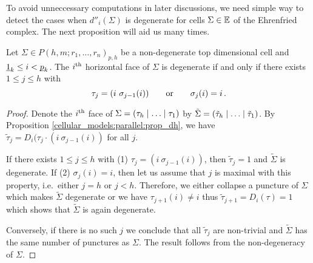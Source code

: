 To avoid unneccessary computations in later discussions, we need simple way to detect the cases when $d''_i(\Sigma)$ is degenerate for cells $\Sigma \in \E$ of the Ehrenfried complex.
The next proposition will aid us many times.

\begin{prop}
\label{cellular_models:ehrenfried:cor_d_hor_deg}
Let $\Sigma \in P(h,m;r_1, \ldots, r_n)_{p,h}$ be a non-degenerate top dimensional cell and $\ul 1_k \le i < \ul p_k$.
The $i\Th$ horizontal face of $\Sigma$ is degenerate if and only if there exists $1 \le j \le h$ with
\[
    \tau_j = (i\ \sigma_{j-1}(i)) \mspc{or}{20} \sigma_j(i) = i \,.
\]
\end{prop}
\begin{proof}
Denote the $i\Th$ face of $\Sigma = \inhom$ by $\tilde \Sigma = \inhom[\tilde\tau]$.
By Proposition \ref{cellular_models:parallel:prop_dh}, we have $\tilde\tau_j = D_i(\tau_j \cdot ( i\ \sigma_{j-1}(i))$ for all $j$.

If there exists $1 \le j \le h$ with (1) $\tau_j = (i\ \sigma_{j-1}(i))$, then $\tilde\tau_j = 1$ and $\tilde\Sigma$ is degenerate.
If (2) $\sigma_j(i) = i$, then let us assume that $j$ is maximal with this property, i.e.\ either $j = h$ or $j < h$.
Therefore, we either collapse a puncture of $\Sigma$ which makes $\tilde\Sigma$ degenerate or we have $\tau_{j+1}(i)\neq i$ thus $\tilde\tau_{j+1} = D_i(\tau) = 1$ which shows that $\tilde\Sigma$ is again degenerate.

Conversely, if there is no such $j$ we conclude that all $\tilde\tau_j$ are non-trivial and $\tilde\Sigma$ has the same number of punctures as $\Sigma$.
The result follows from the non-degeneracy of $\Sigma$.
\end{proof}